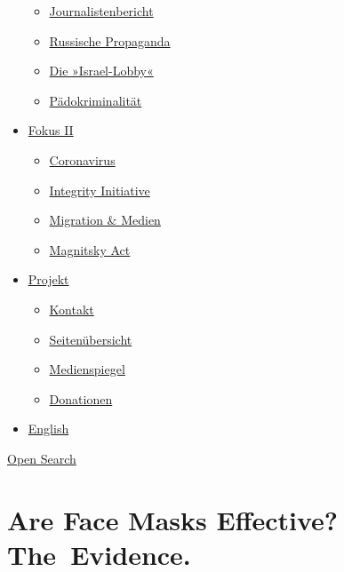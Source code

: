 \begin{itemize}
  \begin{itemize}
  \tightlist
  \item
    \href{https://swprs.org/bericht-eines-journalisten/}{Journalistenbericht}
  \item
    \href{https://swprs.org/russische-propaganda/}{Russische Propaganda}
  \item
    \href{https://swprs.org/die-israel-lobby-fakten-und-mythen/}{Die
    »Israel-Lobby«}
  \item
    \href{https://swprs.org/geopolitik-und-paedokriminalitaet/}{Pädokriminalität}
  \end{itemize}
\item
  \href{https://swprs.org/migration-und-medien/}{Fokus II}

  \begin{itemize}
  \tightlist
  \item
    \href{https://swprs.org/covid-19-hinweis-ii/}{Coronavirus}
  \item
    \href{https://swprs.org/die-integrity-initiative/}{Integrity
    Initiative}
  \item
    \href{https://swprs.org/migration-und-medien/}{Migration \& Medien}
  \item
    \href{https://swprs.org/der-fall-magnitsky/}{Magnitsky Act}
  \end{itemize}
\item
  \href{https://swprs.org/kontakt/}{Projekt}

  \begin{itemize}
  \tightlist
  \item
    \href{https://swprs.org/kontakt/}{Kontakt}
  \item
    \href{https://swprs.org/uebersicht/}{Seitenübersicht}
  \item
    \href{https://swprs.org/medienspiegel/}{Medienspiegel}
  \item
    \href{https://swprs.org/donationen/}{Donationen}
  \end{itemize}
\item
  \href{https://swprs.org/contact/}{English}
\end{itemize}

\protect\hyperlink{}{Open Search}

\hypertarget{are-face-masks-effective-the-evidence}{%
\section{Are Face Masks Effective?
The~Evidence.}\label{are-face-masks-effective-the-evidence}}

